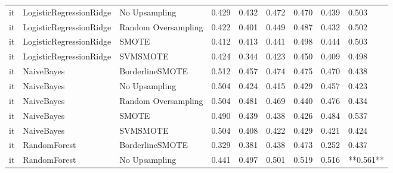 \begin{tabular}{lllllllll}
      it &      LogisticRegressionRidge &       No Upsampling & 0.429 &                     0.432 &                 0.472 &                  0.470 &                                   0.439 &     0.503 \\
      it &      LogisticRegressionRidge & Random Oversampling & 0.422 &                     0.401 &                 0.449 &                  0.487 &                                   0.432 &     0.502 \\
      it &      LogisticRegressionRidge &               SMOTE & 0.412 &                     0.413 &                 0.441 &                  0.498 &                                   0.444 &     0.503 \\
      it &      LogisticRegressionRidge &            SVMSMOTE & 0.424 &                     0.344 &                 0.423 &                  0.450 &                                   0.409 &     0.498 \\
      it &                   NaiveBayes &     BorderlineSMOTE & 0.512 &                     0.457 &                 0.474 &                  0.475 &                                   0.470 &     0.438 \\
      it &                   NaiveBayes &       No Upsampling & 0.504 &                     0.424 &                 0.415 &                  0.429 &                                   0.457 &     0.423 \\
      it &                   NaiveBayes & Random Oversampling & 0.504 &                     0.481 &                 0.469 &                  0.440 &                                   0.476 &     0.434 \\
      it &                   NaiveBayes &               SMOTE & 0.490 &                     0.439 &                 0.438 &                  0.426 &                                   0.484 &     0.537 \\
      it &                   NaiveBayes &            SVMSMOTE & 0.504 &                     0.408 &                 0.422 &                  0.429 &                                   0.421 &     0.424 \\
      it &                 RandomForest &     BorderlineSMOTE & 0.329 &                     0.381 &                 0.438 &                  0.473 &                                   0.252 &     0.437 \\
      it &                 RandomForest &       No Upsampling & 0.441 &                     0.497 &                 0.501 &                  0.519 &                                   0.516 & **0.561** \\

\end{tabular}
